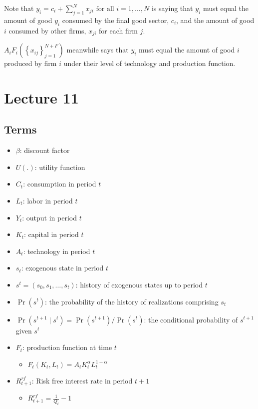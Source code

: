 \documentclass[10pt]{article}
\begin{document}
Note that $y_i=c_i+\sum_{j=1}^N x_{j i} \text { for all } i=1, \ldots, N$ 
is saying that $y_i$ must equal the amount of good $y_i$ consumed 
by the final good sector, $c_i$, and the 
amount of good $i$ consumed by other firms, $x_{j i}$ for each firm $j$.

$A_i F_i\left(\left\{x_{i j}\right\}_{j=1}^{N+F}\right)$ meanwhile 
says that $y_i$ must equal the amount of good $i$ produced by firm $i$
under their level of technology and production function.


\section{Lecture 11}

\subsection{Terms}

\begin{itemize}
    \item $\beta$: discount factor
    \item $U(.)$: utility function
    \item $C_t$: consumption in period $t$
    \item $L_t$: labor in period $t$
    \item $Y_t$: output in period $t$
    \item $K_t$: capital in period $t$
    \item $A_t$: technology in period $t$
    \item $s_t$: exogenous state in period $t$
    \item $s^t = (s_0, s_1, \ldots, s_t)$: history of exogenous states up to period $t$
    \item $\operatorname{Pr}\left(s^t\right)$: the probability of the history of realizations comprising $s_t$
    \item $\operatorname{Pr}\left(s^{t+1} \mid s^t\right)=\operatorname{Pr}\left(s^{t+1}\right) / \operatorname{Pr}\left(s^t\right)$: the conditional probability of $s^{t+1}$ given $s^t$
    \item $F_t$: production function at time $t$
        \begin{itemize}
            \item $F_t\left(K_t, L_t\right)=A_t K_t^\alpha L_t^{1-\alpha}$
        \end{itemize}
    \item $R_{t+1}^{r f}$: Risk free interest rate in period $t+1$
        \begin{itemize}
            \item $R_{t+1}^{r f} = \frac{1}{Q_t} - 1$
        \end{itemize}
\end{itemize}
\end{document}
